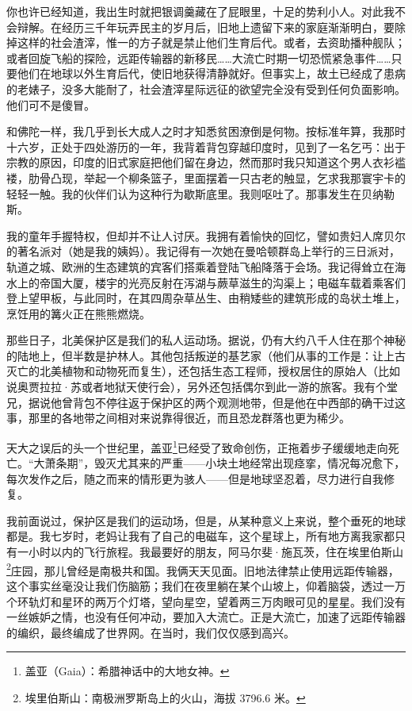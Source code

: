 \documentclass[AutoFakeBold=true]{book}
\begin{document}
你也许已经知道，我出生时就把银调羹藏在了屁眼里，十足的势利小人。对此我不会辩解。在经历三千年玩弄民主的岁月后，旧地上遗留下来的家庭渐渐明白，要除掉这样的社会渣滓，惟一的方子就是禁止他们生育后代。或者，去资助播种舰队；或者回旋飞船的探险，远距传输器的新移民……大流亡时期一切恐慌紧急事件……只要他们在地球以外生育后代，使旧地获得清静就好。但事实上，故土已经成了患病的老婊子，没多大能耐了，社会渣滓星际远征的欲望完全没有受到任何负面影响。他们可不是傻冒。

和佛陀一样，我几乎到长大成人之时才知悉贫困潦倒是何物。按标准年算，我那时十六岁，正处于四处游历的一年，我背着背包穿越印度时，见到了一名乞丐：出于宗教的原因，印度的旧式家庭把他们留在身边，然而那时我只知道这个男人衣衫褴褛，肋骨凸现，举起一个柳条篮子，里面摆着一只古老的触显，乞求我那寰宇卡的轻轻一触。我的伙伴们认为这种行为歇斯底里。我则呕吐了。那事发生在贝纳勒斯。

我的童年手握特权，但却并不让人讨厌。我拥有着愉快的回忆，譬如贵妇人席贝尔的著名派对（她是我的姨妈）。我记得有一次她在曼哈顿群岛上举行的三日派对，轨道之城、欧洲的生态建筑的宾客们搭乘着登陆飞船降落于会场。我记得耸立在海水上的帝国大厦，楼宇的光亮反射在泻湖与蕨草滋生的沟渠上；电磁车载着乘客们登上望甲板，与此同时，在其四周杂草丛生、由稍矮些的建筑形成的岛状土堆上，烹饪用的篝火正在熊熊燃烧。

那些日子，北美保护区是我们的私人运动场。据说，仍有大约八千人住在那个神秘的陆地上，但半数是护林人。其他包括叛逆的基艺家（他们从事的工作是：让上古灭亡的北美植物和动物死而复生），还包括生态工程师，授权居住的原始人（比如说奥贾拉拉·苏或者地狱天使行会），另外还包括偶尔到此一游的旅客。我有个堂兄，据说他曾背包不停往返于保护区的两个观测地带，但是他在中西部的确干过这事，那里的各地带之间相对来说靠得很近，而且恐龙群落也更为稀少。

天大之误后的头一个世纪里，盖亚\footnote{盖亚（Gaia）：希腊神话中的大地女神。}已经受了致命创伤，正拖着步子缓缓地走向死亡。``大萧条期''，毁灭尤其来的严重——小块土地经常出现痉挛，情况每况愈下，每次发作之后，随之而来的情形更为骇人——但是地球坚忍着，尽力进行自我修复。

我前面说过，保护区是我们的运动场，但是，从某种意义上来说，整个垂死的地球都是。我七岁时，老妈让我有了自己的电磁车，这个星球上，所有地方离我家都只有一小时以内的飞行旅程。我最要好的朋友，阿马尔斐·施瓦茨，住在埃里伯斯山\footnote{埃里伯斯山：南极洲罗斯岛上的火山，海拔 3796.6 米。}庄园，那儿曾经是南极共和国。我俩天天见面。旧地法律禁止使用远距传输器，这个事实丝毫没让我们伤脑筋；我们在夜里躺在某个山坡上，仰着脑袋，透过一万个环轨灯和星环的两万个灯塔，望向星空，望着两三万肉眼可见的星星。我们没有一丝嫉妒之情，也没有任何冲动，要加入大流亡。正是大流亡，加速了远距传输器的编织，最终编成了世界网。在当时，我们仅仅感到高兴。
\end{document}
